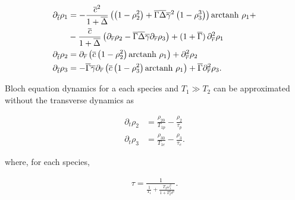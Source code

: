 \documentclass[%
oneside,                 %
final,                   %
10pt]{article}
\begin{document}
\begin{align} 
	\partial_{\overline{t}} \rho_1 
	&=
	-\frac{\overline{c}^2}{1+\overline{\Delta}}
	\left(
		\left(
			1 - \rho_2^2
		\right)
		+
		\overline{\Gamma}\overline{\Delta}\overline{\gamma}^2
		\left(
			1 - \rho_3^3
		\right)
	\right)
	\text{arctanh }\rho_1 + 
	\nonumber\\
	&-\frac{\overline{c}}{1+\overline{\Delta}}
	\left(
		\partial_{\overline{r}} \rho_2 - \overline{\Gamma}\overline{\Delta}\overline{\gamma} \partial_{\overline{r}} \rho_3
	\right)
	+ ( 1 + \overline{\Gamma} )\, \partial_{\overline{r}}^2 \rho_1 \\
	\partial_{\overline{t}} \rho_2 
	&=
	\partial_{\overline{r}}
	\left(
		\overline{c}
		\left( 1 - \rho_2^2 \right)
		\text{arctanh }\rho_1
	\right)
	+ \partial_{\overline{r}}^2 \rho_2 \\
	\partial_{\overline{t}} \rho_3
	&=
	- 
	\overline{\Gamma}\overline{\gamma}
	\partial_{\overline{r}}
	\left(
		\overline{c}
		\left( 1 - \rho_3^2 \right)
		\text{arctanh }\rho_1
	\right)
	+ \overline{\Gamma} \partial_{\overline{r}}^2 \rho_3 .
\end{align}

Bloch equation dynamics for a each species and $T_1 \gg T_2$ can be approximated without the transverse dynamics as \cite{Picone2010}

\begin{align}
	\partial_t \rho_2 &= \frac{\rho_{20}}{T_{1p}} - \frac{\rho_2}{\tau_p} \\
	\partial_t \rho_3 &= \frac{\rho_{30}}{T_{1e}} - \frac{\rho_3}{\tau_e}.
\end{align}

where, for each species,

\begin{align}
	\tau = \frac{1}{\frac{1}{T_1} + \frac{T_2 \omega_1^2}{1+T_2^2 \delta^2}}.
\end{align}








\end{document}
